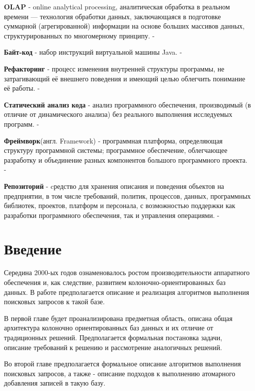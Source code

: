 \documentclass{matmex-diploma}
\begin{document}
    \textbf{OLAP} - online analytical processing, аналитическая обработка в реальном времени — технология обработки данных, заключающаяся в подготовке суммарной (агрегированной) информации на основе больших массивов данных, структурированных по многомерному принципу. - \cite{gartner}
    
    \textbf{Байт-код} - набор инструкций виртуальной машины Java. - \cite{jvm:spec}
    
    \textbf{Рефакторинг} - процесс изменения внутренней структуры программы, не затрагивающий её внешнего поведения и имеющий целью облегчить понимание её работы. - \cite{fowler}
    
    \textbf{Статический анализ кода} - анализ программного обеспечения, производимый (в отличие от динамического анализа) без реального выполнения исследуемых программ. - \cite{wichmann1995industrial}
    
    \textbf{Фреймворк}(англ. Framework) - программная платформа, определяющая структуру программной системы; программное обеспечение, облегчающее разработку и объединение разных компонентов большого программного проекта. - \cite{wiki:framework}
    
    \textbf{Репозиторий} - cредство для хранения описания и поведения объектов на предприятии, в том числе требований, политик, процессов, данных, программных библиотек, проектов, платформ и персонала, с возможностью поддержки как разработки программного обеспечения, так и управления операциями. - \cite{gartner}
    
\section*{Введение}
    Середина 2000-ых годов ознаменовалось ростом производительности аппаратного обеспечения и, как следствие, развитием колоночно-ориентированных баз данных. В работе предполагается описание и реализация алгоритмов выполнения поисковых запросов к такой базе.
    
    В первой главе будет проанализирована предметная область, описана общая архитектура колоночно ориентированных баз данных и их отличие от традиционных решений. Предполагается формальная постановка задачи, описание требований к решению и рассмотрение аналогичных решений.
    
    Во второй главе предполагается формальное описание алгоритмов выполнения поисковых запросов, а также - описание подходов к выполнению атомарного добавления записей в такую базу.
    
\end{document}
